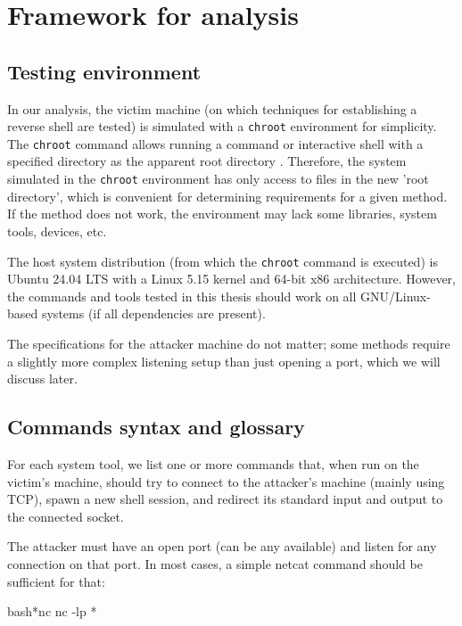 \chapter{Framework for analysis}
\label{Testing framework}

\label{chap:framework}



\section{Testing environment}

In our analysis, the victim machine (on which techniques for establishing a reverse shell are tested) is simulated with a \texttt{chroot} environment for simplicity. The \texttt{chroot} command allows running a command or interactive shell with a specified directory as the apparent root directory \cite{chroot-man}. Therefore, the system simulated in the \texttt{chroot} environment has only access to files in the new 'root directory', which is convenient for determining requirements for a given method. If the method does not work, the environment may lack some libraries, system tools, devices, etc.

The host system distribution (from which the \texttt{chroot} command is executed) is Ubuntu 24.04 LTS with a Linux 5.15 kernel and 64-bit x86 architecture. However, the commands and tools tested in this thesis should work on all GNU/Linux-based systems (if all dependencies are present).

The specifications for the attacker machine do not matter; some methods require a slightly more complex listening setup than just opening a port, which we will discuss later.

\section{Commands syntax and glossary}

For each system tool, we list one or more commands that, when run on the victim's machine, should try to connect to the attacker's machine (mainly using TCP), spawn a new shell session, and redirect its standard input and output to the connected socket.

The attacker must have an open port (can be any available) and listen for any connection on that port. In most cases, a simple netcat command should be sufficient for that:

\begin{cmdline}{bash}{*}{nc}{}
nc -lp *\port*
\end{cmdline}

